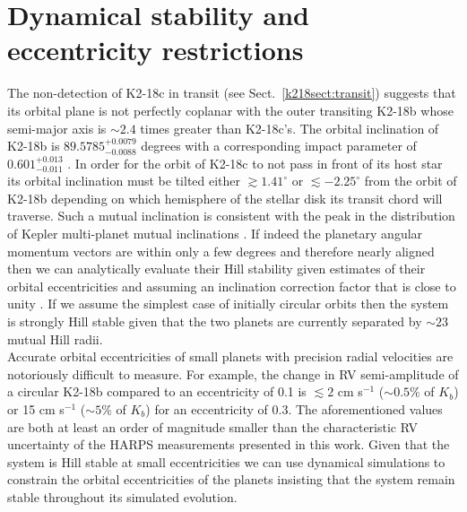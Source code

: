 \section{Dynamical stability and eccentricity restrictions} \label{k218sect:dynam}
The non-detection of K2-18c in transit (see Sect.~\ref{k218sect:transit}) suggests that its orbital plane
is not perfectly coplanar with the outer
transiting K2-18b whose semi-major axis is $\sim 2.4$ times greater than K2-18c's. The orbital inclination
of K2-18b is $89.5785^{+0.0079}_{-0.0088}$ degrees with a corresponding impact parameter
of $0.601^{+0.013}_{-0.011}$ . In order for the orbit of K2-18c
to not pass in front of its host star its orbital inclination must be tilted
either $\gtrsim 1.41^{\circ}$ or $\lesssim -2.25^{\circ}$ from the orbit of K2-18b depending on
which hemisphere of the stellar disk its transit chord will traverse. 
Such a mutual inclination is consistent with the peak in the distribution of Kepler multi-planet
mutual inclinations \citep{figueira12, fabrycky14}.
If indeed the planetary angular momentum vectors are within only a few degrees and therefore
nearly aligned then we can analytically evaluate their Hill stability
given estimates of their orbital eccentricities and assuming an inclination
correction factor that is close to unity \citep{gladman93}. If we assume the simplest case of 
initially circular orbits then the system is strongly Hill stable given that the two planets
are currently separated by $\sim 23$ mutual Hill radii.  \\


Accurate orbital eccentricities of small planets with precision radial velocities are notoriously
difficult to measure. For example, the change in RV semi-amplitude of a circular K2-18b compared to an
eccentricity of 0.1 is $\lesssim 2$ cm s$^{-1}$ ($\sim 0.5$\% of $K_b$) or 15 cm s$^{-1}$
($\sim 5$\% of $K_b$) for an eccentricity of 0.3. The aforementioned values are both at least an
order of magnitude smaller than the characteristic RV uncertainty of the HARPS measurements
presented in this work. Given that the system is Hill stable at small eccentricities 
we can use dynamical simulations to constrain the orbital eccentricities of the
planets insisting that the system remain stable throughout its simulated evolution.  \\

